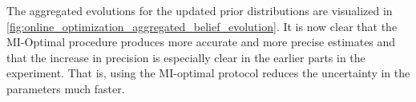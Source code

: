 \documentclass{article}
\begin{document}
The aggregated evolutions for the updated prior distributions are
visualized in \cref{fig:online_optimization_aggregated_belief_evolution}. It is now clear that
the MI-Optimal procedure produces more accurate and more precise estimates and
that the increase in precision is especially clear in the earlier parts in the
experiment. That is, using the MI-optimal protocol reduces the uncertainty in
the parameters much faster.
\end{document}
